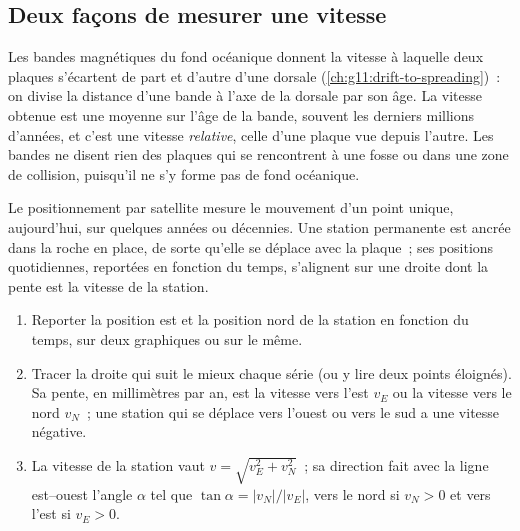 \subsection{Deux façons de mesurer une vitesse}

Les bandes magnétiques du fond océanique donnent la vitesse à laquelle deux
plaques s'écartent de part et d'autre d'une dorsale
(\cref{ch:g11:drift-to-spreading})~: on divise la distance d'une bande à
l'axe de la dorsale par son âge. La vitesse obtenue est une moyenne sur
l'âge de la bande, souvent les derniers millions d'années, et c'est une
vitesse \emph{relative}, celle d'une plaque vue depuis l'autre. Les bandes
ne disent rien des plaques qui se rencontrent à une fosse ou dans une zone
de collision, puisqu'il ne s'y forme pas de fond océanique.

Le positionnement par satellite mesure le mouvement d'un point unique,
aujourd'hui, sur quelques années ou décennies. Une station permanente est
ancrée dans la roche en place, de sorte qu'elle se déplace avec la
plaque~; ses positions quotidiennes, reportées en fonction du temps,
s'alignent sur une droite dont la pente est la vitesse de la station.

\begin{method}\label{met:g11:plate-motions:rate}
\begin{enumerate}
  \item Reporter la position est et la position nord de la station en
        fonction du temps, sur deux graphiques ou sur le même.
  \item Tracer la droite qui suit le mieux chaque série (ou y lire deux
        points éloignés). Sa pente, en millimètres par an, est la vitesse
        vers l'est $v_E$ ou la vitesse vers le nord $v_N$~; une station qui
        se déplace vers l'ouest ou vers le sud a une vitesse négative.
  \item La vitesse de la station vaut $v = \sqrt{v_E^2 + v_N^2}$~; sa
        direction fait avec la ligne est--ouest l'angle $\alpha$ tel que
        $\tan\alpha = |v_N|/|v_E|$, vers le nord si $v_N > 0$ et vers
        l'est si $v_E > 0$.
\end{enumerate}
\end{method}


